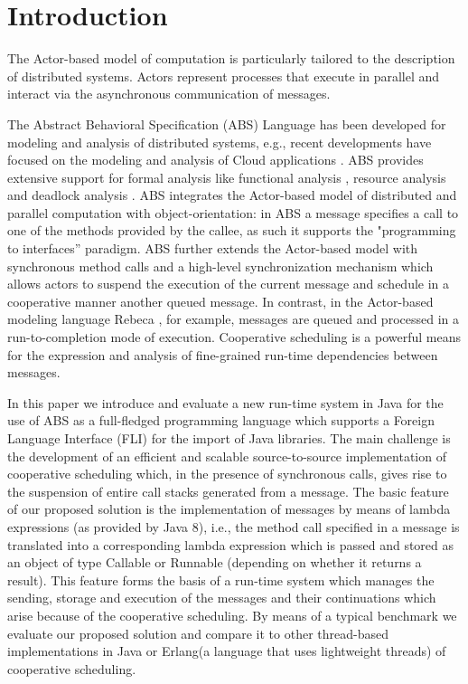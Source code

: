 \section{Introduction}

The Actor-based model of computation \cite{Agha} is particularly tailored to the description of distributed systems. Actors represent processes that execute in parallel and interact via the asynchronous communication of messages.


The Abstract Behavioral Specification (ABS) \cite{abs} Language has been developed
for modeling and analysis of distributed systems, e.g., recent developments
have focused on the modeling and analysis of Cloud applications \cite{Albert}.
ABS provides extensive support for formal analysis like functional analysis \cite{KeY}, resource analysis \cite{saco} and deadlock analysis \cite{dead}.
 ABS integrates the Actor-based model of distributed and parallel computation with object-orientation:
in ABS a message specifies a call to one of the methods provided by the callee,
as such it supports the "programming to interfaces'' paradigm.
ABS further extends the Actor-based model with synchronous method calls and a high-level synchronization mechanism which allows actors to suspend the
execution of the current message and schedule in a cooperative manner another
queued message. 
In contrast, in the Actor-based modeling language Rebeca \cite{Sirjani}, for example,
messages are queued and processed in a run-to-completion mode of execution.
Cooperative scheduling is a powerful means for the expression and analysis
of fine-grained run-time dependencies between messages.



In this paper we introduce and evaluate a new run-time system in Java for the use of ABS as a full-fledged programming language which supports a Foreign Language Interface (FLI) for the import of Java libraries. 
The main challenge is the development of an efficient and scalable source-to-source implementation of cooperative scheduling which, in the presence of synchronous calls, gives rise to the suspension of entire call stacks generated from a message.
The basic feature of our proposed solution is the implementation of messages by means of lambda expressions (as provided by Java 8), i.e., the method call specified in a message
is translated into a corresponding lambda expression \cite{lambdas} which is passed and stored as
an object of type Callable or Runnable (depending on whether it returns a result).
This feature forms the basis of a run-time system which manages
the sending, storage and execution of the messages and their continuations
which arise because of the cooperative scheduling.
By means of a typical benchmark we evaluate our proposed solution and compare it
to other thread-based implementations in Java or Erlang(a language that uses lightweight threads) of cooperative scheduling.

